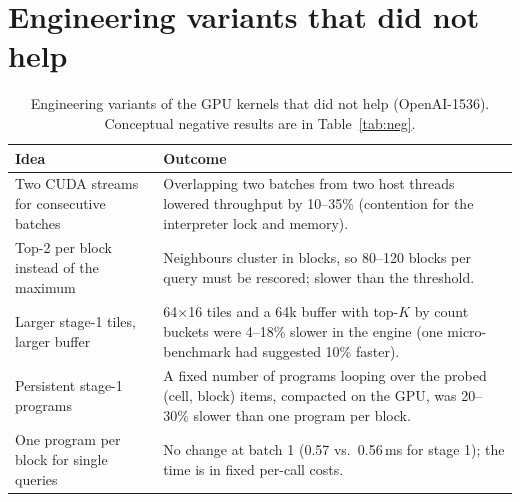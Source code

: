 \documentclass[10pt]{article}
\begin{document}
\section{Engineering variants that did not help}\label{sn:neg}
\begin{table}[!htbp]
\caption{Engineering variants of the GPU kernels that did not help (OpenAI-1536). Conceptual negative results are in Table~\ref{tab:neg}.}
\label{tab:neg2}
\small
\begin{tabular}{p{4.5cm}p{11cm}}
\toprule
Idea & Outcome \\
\midrule
Two CUDA streams for consecutive batches & Overlapping two batches from two host threads lowered throughput by 10--35\% (contention for the interpreter lock and memory). \\
Top-2 per block instead of the maximum & Neighbours cluster in blocks, so 80--120 blocks per query must be rescored; slower than the threshold. \\
Larger stage-1 tiles, larger buffer & 64$\times$16 tiles and a 64k buffer with top-$K$ by count buckets were 4--18\% slower in the engine (one micro-benchmark had suggested 10\% faster). \\
Persistent stage-1 programs & A fixed number of programs looping over the probed (cell, block) items, compacted on the GPU, was 20--30\% slower than one program per block. \\
One program per block for single queries & No change at batch 1 (0.57 vs.\ 0.56\,ms for stage 1); the time is in fixed per-call costs. \\
\bottomrule
\end{tabular}
\end{table}



\end{document}
